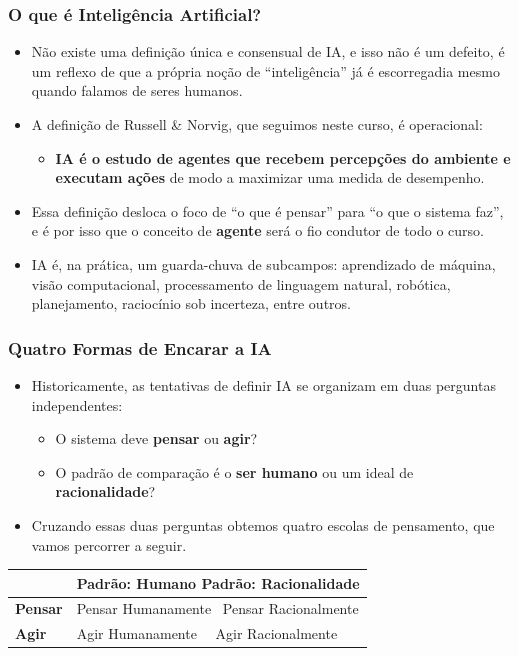 \documentclass{beamer}
\begin{document}
\begin{frame}
\frametitle{O que é Inteligência Artificial?}
\small
\begin{itemize}
    \item Não existe uma definição única e consensual de IA, e isso não é um defeito, é um reflexo de que a própria noção de ``inteligência'' já é escorregadia mesmo quando falamos de seres humanos.
    \item A definição de Russell \& Norvig, que seguimos neste curso, é operacional:
    \begin{itemize}
     \item \textbf{IA é o estudo de agentes que recebem percepções do ambiente e executam ações} de modo a maximizar uma medida de desempenho.
    \end{itemize}
    \item Essa definição desloca o foco de ``o que é pensar'' para ``o que o sistema faz'', e é por isso que o conceito de \textbf{agente} será o fio condutor de todo o curso.
    \item IA é, na prática, um guarda-chuva de subcampos: aprendizado de máquina, visão computacional, processamento de linguagem natural, robótica, planejamento, raciocínio sob incerteza, entre outros.
\end{itemize}
\end{frame}

\begin{frame}
\frametitle{Quatro Formas de Encarar a IA}
\begin{itemize}
    \item Historicamente, as tentativas de definir IA se organizam em duas perguntas independentes:
    \begin{itemize}
        \item O sistema deve \textbf{pensar} ou \textbf{agir}?
        \item O padrão de comparação é o \textbf{ser humano} ou um ideal de \textbf{racionalidade}?
    \end{itemize}
    \item Cruzando essas duas perguntas obtemos quatro escolas de pensamento, que vamos percorrer a seguir.
\end{itemize}
\begin{center}
\begin{tabular}{@{}ll@{}}
\toprule
 & \textbf{Padrão: Humano} \quad\quad \textbf{Padrão: Racionalidade} \\
\midrule
\textbf{Pensar} & Pensar Humanamente \quad\ Pensar Racionalmente \\
\textbf{Agir}   & Agir Humanamente \quad\quad\ \ Agir Racionalmente \\
\bottomrule
\end{tabular}
\end{center}
\end{frame}
\end{document}
